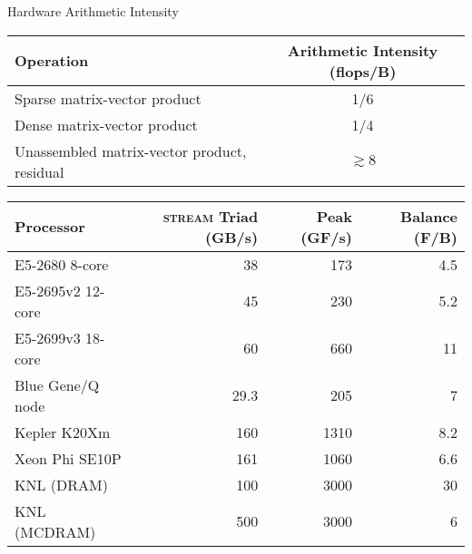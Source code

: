 \begin{frame}{Hardware Arithmetic Intensity}
  \begin{tabular}{lc}
    \toprule
    Operation                         & Arithmetic Intensity (flops/B) \\
    \midrule
    Sparse matrix-vector product      & 1/6                  \\
    Dense matrix-vector product       & 1/4                  \\
    Unassembled matrix-vector product, residual & $\gtrsim 8$          \\
    \bottomrule
  \end{tabular}

  \bigskip

  \begin{tabular}{lrrr}
    \toprule
    Processor & \textsc{stream} Triad (GB/s) & Peak (GF/s) & Balance (F/B) \\
    \midrule
    E5-2680 8-core      & 38   & 173  & 4.5 \\ %
    E5-2695v2 12-core & 45 & 230 & 5.2 \\ %
    E5-2699v3 18-core & 60 & 660 & 11 \\
    Blue Gene/Q node    & 29.3   & 205  & 7 \\ %
    Kepler K20Xm        & 160 & 1310 & 8.2 \\ %
    Xeon Phi SE10P      & 161 & 1060 & 6.6 \\ %
    \midrule
    KNL (DRAM) & 100 & 3000 & 30 \\
    KNL (MCDRAM) & 500 & 3000 & 6 \\
    \bottomrule
  \end{tabular}
\end{frame}

